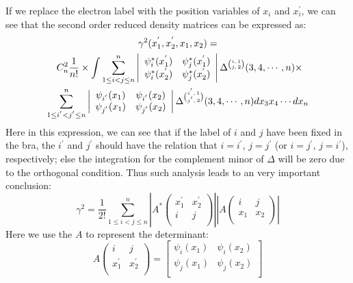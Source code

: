 If we replace the electron label with the position variables of
$x_{i}$ and $x_{i}^{'}$, we can see that the second order reduced
density matrices can be expressed as:
\begin{multline}\label{}
  \gamma^{2}(x^{'}_{1},x^{'}_{2},x_{1},x_{2}) = \\
  \shoveleft{C^{2}_{n}\frac{1}{n!}\times\int \sum^{n}_{1 \leq i<j \leq n}
     \left|
      \begin{array}{cc}
        \psi^{*}_{i}(x^{'}_{1}) &  \psi^{*}_{j}(x^{'}_{1})  \\
        \psi^{*}_{i}(x^{'}_{2}) & \psi^{*}_{j}(x^{'}_{2})   \\
      \end{array}
    \right| \Delta^{ i,\,1 \choose j,\,2 }
    (3,4,\cdots,n)\times} \\
  \sum^{n}_{1 \leq i^{'}<j^{'} \leq n}\left|
    \begin{array}{cc}
      \psi_{i^{'}}(x_{1}) & \psi_{i^{'}}(x_{2}) \\
      \psi_{j^{'}}(x_{1}) & \psi_{j^{'}}(x_{2}) \\
    \end{array}
  \right| \Delta^{ i^{'},\,1 \choose j^{'},\,2 } (3,4,\cdots,n)
  dx_{3}x_{4}\cdots dx_{n}
\end{multline}
Here in this expression, we can see that if the label of $i$ and $j$
have been fixed in the bra, the $i^{'}$ and $j^{'}$ should have the
relation that $i=i^{'}$, $j=j^{'}$ (or $i=j^{'}$, $j=i^{'}$),
respectively; else the integration for the complement minor of
$\Delta$ will be zero due to the orthogonal condition. Thus such
analysis leads to an very important conclusion:
\begin{equation}\label{DMeq:8}
  \gamma^{2} = \frac{1}{2!}\sum^{n}_{1 \leq i<j \leq
    n}
\left|A^{*}\begin{pmatrix}
             x^{'}_{1} & x^{'}_{2} \\
             i & j \\
           \end{pmatrix}
\right|
\left|A\begin{pmatrix}
             i & j \\
             x_{1} & x_{2} \\
           \end{pmatrix}
\right|
\end{equation}
Here we use the $A$ to represent the determinant:
\begin{equation}\label{}
A\begin{pmatrix}
             i & j \\
             x^{'}_{1} & x^{'}_{2} \\
           \end{pmatrix} = \left[
      \begin{array}{cc}
        \psi_{i}(x_{1}) &  \psi_{i}(x_{2})  \\
        \psi_{j}(x_{1}) &  \psi_{j}(x_{2})   \\
      \end{array}
    \right]
\end{equation}
